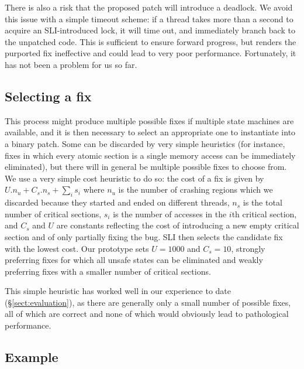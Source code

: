 \documentclass[10pt,twocolumn,preprint,natbib,authoryear]{sigplanconf}
\begin{document}
There is also a risk that the proposed patch will introduce a
deadlock.  We avoid this issue with a simple timeout scheme: if a
thread takes more than a second to acquire an SLI-introduced lock, it
will time out, and immediately branch back to the unpatched code.
This is sufficient to ensure forward progress, but renders the
purported fix ineffective and could lead to very poor performance.
Fortunately, it has not been a problem for us so far.

\subsection{Selecting a fix}
\label{sect:selectfix}

This process might produce multiple possible fixes if multiple state
machines are available, and it is then necessary to select an
appropriate one to instantiate into a binary patch.  Some can be
discarded by very simple heuristics (for instance, fixes in which
every atomic section is a single memory access can be immediately
eliminated), but there will in general be multiple possible fixes to
choose from.  We use a very simple cost heuristic to do so: the cost
of a fix is given by $U.n_u + C_s.n_s + {\sum_{i}}s_i$ where $n_u$ is
the number of crashing regions which we discarded because they started
and ended on different threads, $n_s$ is the total number of critical
sections, $s_i$ is the number of accesses in the $i$th critical
section, and $C_s$ and $U$ are constants reflecting the cost of
introducing a new empty critical section and of only partially fixing
the bug.  SLI then selects the candidate fix with the lowest cost.
Our prototype sets $U=1000$ and $C_s=10$, strongly preferring fixes
for which all unsafe states can be eliminated and weakly preferring
fixes with a smaller number of critical sections.

This simple heuristic has worked well in our experience to date
(\S\ref{sect:evaluation}), as there are generally only a small number
of possible fixes, all of which are correct and none of which would
obviously lead to pathological performance.

\subsection{Example}
\label{sect:final_example}
\end{document}
